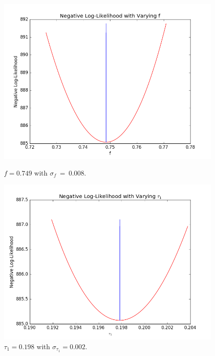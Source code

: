 \documentclass[a4paper,12pt]{article}
\begin{document}
\begin{figure}[h]
\centering
\begin{minipage}{.32\textwidth}
  \centering
  \includegraphics[width=1.05\linewidth]{img/fraction_varyingNLL}
  \caption{$f=0.749$ with $\sigma_f~=~0.008$.}
  \label{fig.3}
\end{minipage}%
\begin{minipage}{.32\textwidth}
  \centering
  \includegraphics[width=1.05\linewidth]{img/tau1_varyingNLL}
  \caption{$\tau_1=0.198$ with $\sigma_{\tau_1}=0.002$.}
  \label{fig.4}
\end{minipage}
\begin{minipage}{.32\textwidth}
  \centering

\end{minipage}
\end{figure}
\end{document}
